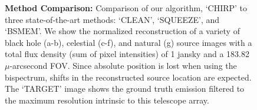 \begin{figure}[ht!]
\begin{center}
\begin{tabular}{  c | c  c |  c  c  c  c | c  }
				
			\end{tabular}
			\caption{\footnotesize{ {\bf Method Comparison: } Comparison of our algorithm, `CHIRP' to three state-of-the-art methods: `CLEAN', `SQUEEZE', and `BSMEM'. We show the normalized reconstruction of a variety of black hole (a-b), celestial (c-f), and natural (g) source images with a total flux density (sum of pixel intensities) of 1 jansky and a 183.82 $\mu$-arcsecond FOV. Since absolute position is lost when using the bispectrum, shifts in the reconstructed source location are expected. The `TARGET' image shows the ground truth emission filtered to the maximum resolution intrinsic to this telescope array.  \vspace{-.2in}  
				}}
				\label{fig:comp}
			\end{center}
		\end{figure}


	
	
